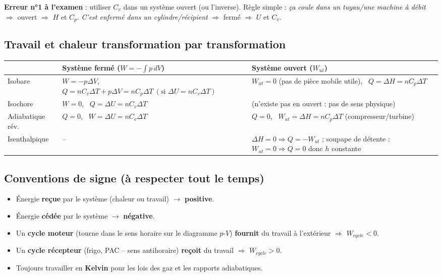 \begin{piege}
\textbf{Erreur n°1 à l'examen} : utiliser $C_v$ dans un système ouvert (ou l'inverse). Règle simple :
\emph{ça coule dans un tuyau/une machine à débit} $\Rightarrow$ ouvert $\Rightarrow$ $H$ et $C_p$.
\emph{C'est enfermé dans un cylindre/récipient} $\Rightarrow$ fermé $\Rightarrow$ $U$ et $C_v$.
\end{piege}

\subsection{Travail et chaleur transformation par transformation}

\begin{center}
\renewcommand{\arraystretch}{1.6}
\begin{tabularx}{\linewidth}{@{}l X X@{}}
\toprule
& \textbf{Système fermé} ($W=-\int p\,dV$) & \textbf{Système ouvert} ($W_{ut}$) \\
\midrule
Isobare & $W=-p\Delta V$, \ $Q=nC_v\Delta T + p\Delta V = nC_p\Delta T\ (\text{si } \Delta U{=}nC_v\Delta T)$ &
$W_{ut}=0$ (pas de pièce mobile utile), \ $Q=\Delta H = nC_p\Delta T$ \\
Isochore & $W=0$, \ $Q=\Delta U = nC_v\Delta T$ & (n'existe pas en ouvert : pas de sens physique) \\
Adiabatique rév. & $Q=0$, \ $W=\Delta U = nC_v\Delta T$ & $Q=0$, \ $W_{ut}=\Delta H = nC_p\Delta T$
(compresseur/turbine) \\
Isenthalpique & -- & $\Delta H=0 \Rightarrow Q=-W_{ut}$ ; soupape de détente : $W_{ut}=0 \Rightarrow Q=0$
donc $h$ constante \\
\bottomrule
\end{tabularx}
\end{center}

\subsection{Conventions de signe (à respecter tout le temps)}

\begin{itemize}[leftmargin=1.4em]
\item Énergie \textbf{reçue} par le système (chaleur ou travail) $\rightarrow$ \textbf{positive}.
\item Énergie \textbf{cédée} par le système $\rightarrow$ \textbf{négative}.
\item Un \textbf{cycle moteur} (tourne dans le sens horaire sur le diagramme $p$-$V$) \textbf{fournit} du
travail à l'extérieur $\Rightarrow$ $W_{cycle}<0$.
\item Un \textbf{cycle récepteur} (frigo, PAC -- sens antihoraire) \textbf{reçoit} du travail
$\Rightarrow$ $W_{cycle}>0$.
\item Toujours travailler en \textbf{Kelvin} pour les lois des gaz et les rapports adiabatiques.
\end{itemize}

